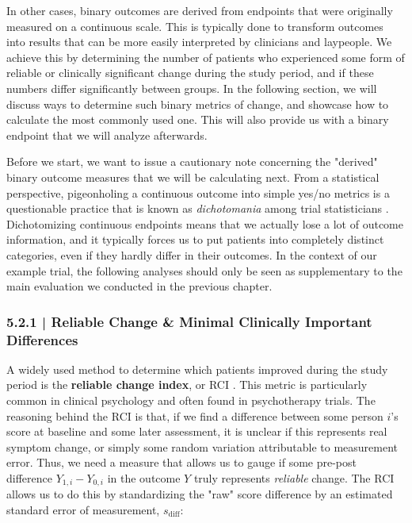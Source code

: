 In other cases, binary outcomes are derived from endpoints that were originally measured on a continuous scale. This is typically done to transform outcomes into results that can be more easily interpreted by clinicians and laypeople. We achieve this by determining the number of patients who experienced some form of reliable or clinically significant change during the study period, and if these numbers differ significantly between groups. In the following section, we will discuss ways to determine such binary metrics of change, and showcase how to calculate the most commonly used one. This will also provide us with a binary endpoint that we will analyze afterwards.  

Before we start, we want to issue a cautionary note concerning the "derived" binary outcome measures that we will be calculating next. From a statistical perspective, pigeonholing a continuous outcome into simple yes/no metrics is a questionable practice that is known as \emph{dichotomania} among trial statisticians \citep{senn2005dichotomania}. Dichotomizing continuous endpoints means that we actually lose a lot of outcome information, and it typically forces us to put patients into completely distinct categories, even if they hardly differ in their outcomes. In the context of our example trial, the following analyses should only be seen as supplementary to the main evaluation we conducted in the previous chapter.

\subsubsection{{\normalfont\textsf{\textcolor{sBlue}{\small 5.2.1 |}}} Reliable Change \& Minimal Clinically Important Differences}

A widely used method to determine which patients improved during the study period is the \textbf{reliable change index}, or RCI \citep{jacobson1992clinical}. This metric is particularly common in clinical psychology and often found in psychotherapy trials. The reasoning behind the RCI is that, if we find a difference between some person $i$'s score at baseline and some later assessment, it is unclear if this represents real symptom change, or simply some random variation attributable to measurement error. Thus, we need a measure that allows us to gauge if some pre-post difference $Y_{1,i}-Y_{0,i}$ in the outcome $Y$ truly represents \emph{reliable} change. The RCI allows us to do this by standardizing the "raw" score difference by an estimated standard error of measurement, $s_{\text{diff}}$:

